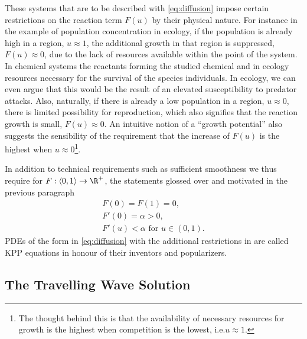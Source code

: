 These systems that are to be described with \cref{eq:diffusion} impose certain restrictions on the reaction term
    \(F(u)\) by their physical nature.
For instance in the example of population concentration in ecology, if the population is already high in a region, 
    \(u \approx 1\), the additional growth in that region is suppressed, \(F(u) \approx 0\), due to the lack of 
    resources available within the point of the system.
In chemical systems the reactants forming the studied chemical and in ecology resources necessary for the survival of 
    the species individuals.
In ecology, we can even argue that this would be the result of an elevated susceptibility to predator attacks.
Also, naturally, if there is already a low population in a region, \(u \approx 0\), there is limited possibility for
    reproduction, which also signifies that the reaction growth is small, \(F(u) \approx 0\).
An intuitive notion of a ``growth potential'' also suggests the sensibility of the requirement that the
    increase of \(F(u)\) is the highest when \(u \approx 0\)\footnote{The thought behind this is that the availability of
    necessary resources for growth is the highest when competition is the lowest, i.e.\@ \(u\approx 1\).}.

In addition to technical requirements such as sufficient smoothness we thus require for 
    \(F: \left< 0,1 \right> \to \R^{+}\), the statements glossed over and motivated in the previous paragraph
\begin{equation}\label{eq:kpp-restrictions}
    \begin{gathered}
    F(0) = F(1) = 0,\\
    F'(0) = \alpha > 0,\\
    F'(u) < \alpha \text{ for } u \in (0, 1).
    \end{gathered}
\end{equation}
\acp{PDE} of the form in \cref{eq:diffusion} with the additional restrictions in  are called 
    \acf{KPP} equations in honour of their inventors and popularizers.


\subsection{The Travelling Wave Solution}%
\label{sub:travelling-wave-solution}

